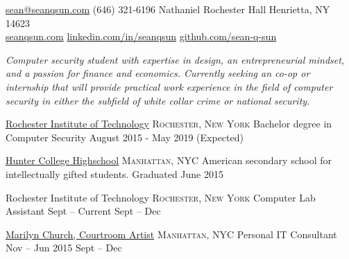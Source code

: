 \documentclass[10pt,a4paper]{article}
\begin{document}
\sloppy 



\nobreakvspace{0.3em}  %

\noindent\href{mailto:sean.at.seanqsun.dot.com}{sean\mbox{}@\mbox{}seanqsun.com}\sbull
(646) 321-6196 Nathaniel Rochester Hall Henrietta, NY 14623
\\
\noindent\href{http://www.seanqsun.com}{seanqsun.com}\sbull
\href{http://www.linkedin.com/in/ciesbreijs}{linkedin.com/in/seanqsun}\sbull
\href{https://www.github.com/sean-q-sun}{github.com/sean-q-sun}

\spacedhrule{0.2em}{-0.4em}  %

\noindent \emph{Computer security student with expertise in design, an entrepreneurial mindset, and a passion for finance and economics. Currently seeking an co-op or internship that will provide practical work experience in the field of computer security in either the subfield of white collar crime or national security.}

\spacedhrule{0.2em}{-0.4em}


\headedsection
  {\href{https://www.rit.edu/gccis/computingsecurity/}{Rochester Institute of Technology}}
  {\textsc{Rochester, New York}} {
  \headedsubsection
    {Bachelor degree in Computer Security}
    {August 2015 - May 2019 (Expected)} 
    {}
}

\headedsection
  {\href{http://www.hunterschools.org/hs}{Hunter College Highschool}}
  {\textsc{Manhattan, NYC}} {
  \headedsubsection
    {American secondary school for intellectually gifted students.}
    {Graduated June 2015} {}
}


\spacedhrule{0em}{-0.4em}

\headedsection  %
  {Rochester Institute of Technology}
  {\textsc{Rochester, New York}} {
  \headedsubsection
  {Computer Lab Assistant}
  {Sept  -- Current}
  {}
    {Sept  -- Dec }
    {}
}

\headedsection  %
  {\href{http://www.marilynchurch.com/}{Marilyn Church, Courtroom Artist}}
  {\textsc{Manhattan, NYC}} {
  \headedsubsection
  {Personal IT Consultant}
  {Nov  -- Jun 2015}
  {}
    {Sept  -- Dec }
    {}
}
\end{document}
